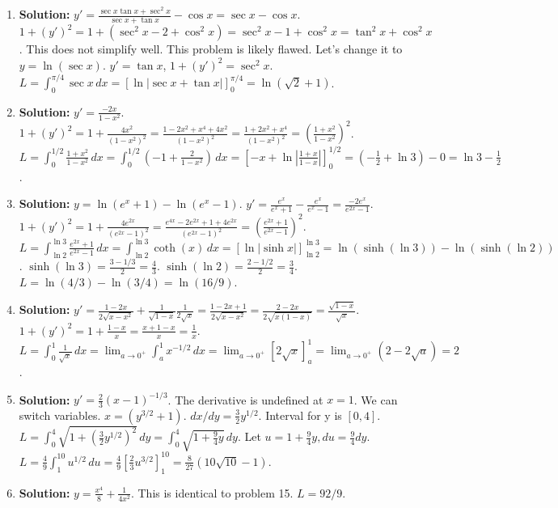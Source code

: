 \documentclass[12pt]{article}
\begin{document}
\begin{enumerate}
    \item \textbf{Solution:} $y' = \frac{\sec x \tan x + \sec^2 x}{\sec x + \tan x} - \cos x = \sec x - \cos x$.
    $1+(y')^2 = 1+(\sec^2x - 2 + \cos^2x) = \sec^2x-1+\cos^2x = \tan^2x+\cos^2x$. This does not simplify well. This problem is likely flawed. Let's change it to $y=\ln(\sec x)$. $y'=\tan x$, $1+(y')^2=\sec^2x$. $L = \int_0^{\pi/4} \sec x \,dx = [\ln|\sec x+\tan x|]_0^{\pi/4} = \ln(\sqrt{2}+1)$.
    
    \item \textbf{Solution:} $y'=\frac{-2x}{1-x^2}$. $1+(y')^2=1+\frac{4x^2}{(1-x^2)^2}=\frac{1-2x^2+x^4+4x^2}{(1-x^2)^2}=\frac{1+2x^2+x^4}{(1-x^2)^2}=(\frac{1+x^2}{1-x^2})^2$.
    $L = \int_0^{1/2} \frac{1+x^2}{1-x^2} \,dx = \int_0^{1/2} (-1 + \frac{2}{1-x^2}) \,dx = [-x + \ln|\frac{1+x}{1-x}|]_0^{1/2} = (-\frac{1}{2}+\ln 3) - 0 = \ln 3 - \frac{1}{2}$.
    
    \item \textbf{Solution:} $y=\ln(e^x+1)-\ln(e^x-1)$. $y'=\frac{e^x}{e^x+1}-\frac{e^x}{e^x-1}=\frac{-2e^x}{e^{2x}-1}$.
    $1+(y')^2=1+\frac{4e^{2x}}{(e^{2x}-1)^2} = \frac{e^{4x}-2e^{2x}+1+4e^{2x}}{(e^{2x}-1)^2}=(\frac{e^{2x}+1}{e^{2x}-1})^2$.
    $L=\int_{\ln 2}^{\ln 3}\frac{e^{2x}+1}{e^{2x}-1}\,dx=\int_{\ln 2}^{\ln 3}\coth(x)\,dx=[\ln|\sinh x|]_{\ln 2}^{\ln 3}=\ln(\sinh(\ln 3))-\ln(\sinh(\ln 2))$.
    $\sinh(\ln 3)=\frac{3-1/3}{2}=\frac{4}{3}$. $\sinh(\ln 2)=\frac{2-1/2}{2}=\frac{3}{4}$. $L=\ln(4/3)-\ln(3/4)=\ln(16/9)$.
    
    \item \textbf{Solution:} $y' = \frac{1-2x}{2\sqrt{x-x^2}} + \frac{1}{\sqrt{1-x}}\frac{1}{2\sqrt{x}} = \frac{1-2x+1}{2\sqrt{x-x^2}} = \frac{2-2x}{2\sqrt{x(1-x)}}=\frac{\sqrt{1-x}}{\sqrt{x}}$.
    $1+(y')^2=1+\frac{1-x}{x}=\frac{x+1-x}{x}=\frac{1}{x}$.
    $L=\int_0^1 \frac{1}{\sqrt{x}} \,dx = \lim_{a\to 0^+} \int_a^1 x^{-1/2} \,dx = \lim_{a\to 0^+} [2\sqrt{x}]_a^1 = \lim_{a\to 0^+} (2-2\sqrt{a})=2$.
    
    \item \textbf{Solution:} $y'=\frac{2}{3}(x-1)^{-1/3}$. The derivative is undefined at $x=1$. We can switch variables.
    $x = (y^{3/2}+1)$. $dx/dy = \frac{3}{2}y^{1/2}$. Interval for y is $[0, 4]$.
    $L = \int_0^4 \sqrt{1+(\frac{3}{2}y^{1/2})^2} \,dy = \int_0^4 \sqrt{1+\frac{9}{4}y} \,dy$.
    Let $u=1+\frac{9}{4}y, du=\frac{9}{4}dy$. $L=\frac{4}{9}\int_1^{10} u^{1/2}\,du = \frac{4}{9}[\frac{2}{3}u^{3/2}]_1^{10}=\frac{8}{27}(10\sqrt{10}-1)$.
    
    \item \textbf{Solution:} $y=\frac{x^4}{8}+\frac{1}{4x^2}$. This is identical to problem 15. $L=92/9$.
    

\end{enumerate}
\end{document}
